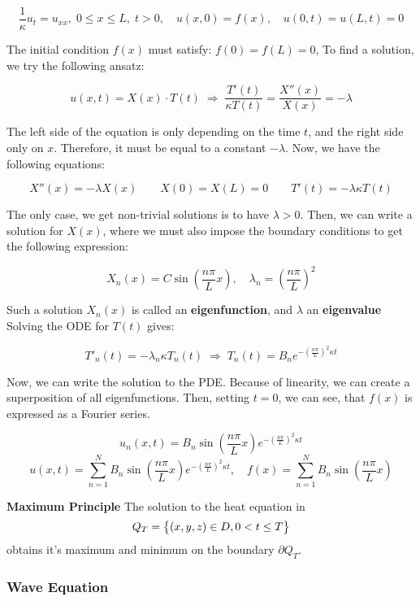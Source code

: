 \documentclass{article}
\begin{document}
\begin{twocolumn}
$$\frac1\kappa u_t = u_{xx}, \; 0 \leq x \leq L, \; t > 0, \quad u(x,0) = f(x), \quad u(0,t) = u(L,t) = 0$$

The initial condition $f(x)$ must satisfy: $f(0) = f(L) = 0$,
To find a solution, we try the following ansatz:

$$u(x,t) = X(x) \cdot T(t) \; \Rightarrow \; \frac{T'(t)}{\kappa T(t)} = \frac{X''(x)}{X(x)} = -\lambda$$

The left side of the equation is only depending on the time $t$, and the right side only on $x$. Therefore, it must be equal to a constant $-\lambda$. Now, we have the following equations:

$$X''(x) = -\lambda X(x) \qquad X(0) = X(L) = 0 \qquad T'(t) = -\lambda \kappa T(t)$$

The only case, we get non-trivial solutions is to have $\lambda > 0$. Then, we can write a solution for $X(x)$, where we must also impose the boundary conditions to get the following expression:

$$X_n(x) = C \sin\left(\frac{n \pi}{L} x\right), \quad \lambda_n = \left(\frac{n\pi}{L}\right)^2$$

Such a solution $X_n(x)$ is called an \textbf{eigenfunction}, and $\lambda$ an \textbf{eigenvalue}
Solving the ODE for $T(t)$ gives:

$$T'_n(t) = -\lambda_n \kappa T_n(t) \; \Rightarrow \; T_n(t) = B_n e^{-\left(\frac{n\pi}{L}\right)^2 \kappa t}$$

Now, we can write the solution to the PDE. 
Because of linearity, we can create a superposition of all eigenfunctions. 
Then, setting $t=0$, we can see, that $f(x)$ is expressed as a Fourier series.

$$u_n(x,t) = B_n \sin \left(\frac{n \pi}{L} x\right) e^{-\left(\frac{n\pi}{L}\right)^2 \kappa t}$$
$$u(x,t) = \sum_{n=1}^{N}B_n \sin \left(\frac{n\pi}{L} x \right) e^{-\left(\frac{n \pi}{L}\right)^2 \kappa t}, \quad f(x) = \sum_{n=1}^{N} B_n \sin \left(\frac{n\pi}{L} x \right)$$

\textbf{Maximum Principle} The solution to the heat equation in 
$$Q_T = \begin{set}{(x,y,z) \in D, 0 < t \leq T}\end{set}$$
obtains it's maximum and minimum on the boundary $\partial Q_T$.

\subsubsection{Wave Equation}


\end{twocolumn}
\end{document}

